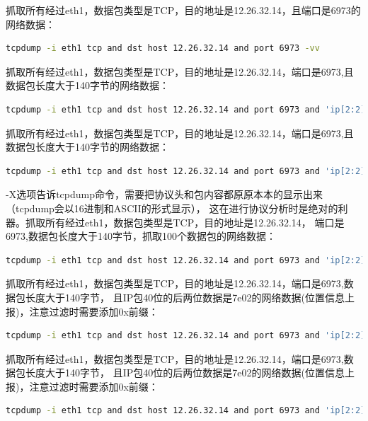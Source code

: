 \documentclass{book}
\begin{document}
抓取所有经过eth1，数据包类型是TCP，目的地址是12.26.32.14，且端口是6973的网络数据：

\begin{lstlisting}[language=Bash]
tcpdump -i eth1 tcp and dst host 12.26.32.14 and port 6973 -vv
\end{lstlisting}

抓取所有经过eth1，数据包类型是TCP，目的地址是12.26.32.14，端口是6973,且数据包长度大于140字节的网络数据：

\begin{lstlisting}[language=Bash]
tcpdump -i eth1 tcp and dst host 12.26.32.14 and port 6973 and 'ip[2:2]>140' -vv
\end{lstlisting}

抓取所有经过eth1，数据包类型是TCP，目的地址是12.26.32.14，端口是6973,且数据包长度大于140字节的网络数据：

\begin{lstlisting}[language=Bash]
tcpdump -i eth1 tcp and dst host 12.26.32.14 and port 6973 and 'ip[2:2]>140' -vv -X
\end{lstlisting}

-X选项告诉tcpdump命令，需要把协议头和包内容都原原本本的显示出来（tcpdump会以16进制和ASCII的形式显示），
这在进行协议分析时是绝对的利器。抓取所有经过eth1，数据包类型是TCP，目的地址是12.26.32.14，
端口是6973,数据包长度大于140字节，抓取100个数据包的网络数据：

\begin{lstlisting}[language=Bash]
tcpdump -i eth1 tcp and dst host 12.26.32.14 and port 6973 and 'ip[2:2]>140' -vv -X -c 100
\end{lstlisting}

抓取所有经过eth1，数据包类型是TCP，目的地址是12.26.32.14，端口是6973,数据包长度大于140字节，
且IP包40位的后两位数据是7e02的网络数据(位置信息上报)，注意过滤时需要添加0x前缀：

\begin{lstlisting}[language=Bash]
tcpdump -i eth1 tcp and dst host 12.26.32.14 and port 6973 and 'ip[2:2]>140 and ip[40,2]=0x7e02' -vv -X -c 100
\end{lstlisting}

抓取所有经过eth1，数据包类型是TCP，目的地址是12.26.32.14，端口是6973,数据包长度大于140字节，
且IP包40位的后两位数据是7e02的网络数据(位置信息上报)，注意过滤时需要添加0x前缀：

\begin{lstlisting}[language=Bash]
tcpdump -i eth1 tcp and dst host 12.26.32.14 and port 6973 and 'ip[2:2]>140 and ip[40,2]=0x7e02' -vv -X -c 100
\end{lstlisting}
\end{document}
